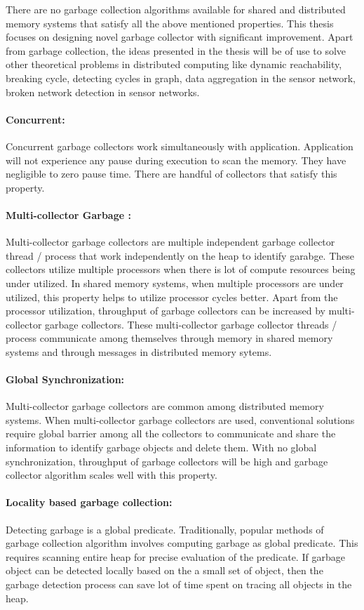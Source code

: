 There are no garbage collection algorithms available for shared and distributed memory systems that satisfy all the above mentioned properties.  This thesis focuses on designing novel garbage collector with significant improvement. Apart from garbage collection, the ideas presented in the thesis will be of use to solve other theoretical problems in distributed computing like dynamic reachability, breaking cycle, detecting cycles in graph, data aggregation in the sensor network, broken network detection in sensor networks.


\paragraph{Concurrent:}
	Concurrent garbage collectors work simultaneously with application. Application will not experience any pause during execution to scan the memory. They
	have negligible to zero pause time. There are handful of collectors that satisfy this property. 
\paragraph{Multi-collector Garbage :}
	Multi-collector garbage collectors are multiple independent garbage collector thread / process that work independently on the heap to identify garabge. These collectors utilize multiple processors when there is lot of compute resources being under utilized. In shared memory systems, when multiple processors are under utilized, this property helps to utilize processor cycles better. Apart from the processor utilization, throughput of garbage collectors can be increased by multi-collector garbage collectors. These multi-collector garbage collector threads / process communicate among themselves through memory in shared memory systems and through messages in distributed memory sytems.
\paragraph{Global Synchronization:}
	Multi-collector garbage collectors are common among distributed memory systems. 
	When multi-collector garbage collectors are used, conventional solutions require global barrier among all the collectors to communicate and share the information to identify garbage objects and delete them. With no global synchronization, throughput of garbage collectors will be high and garbage collector algorithm scales well with this property.
\paragraph{Locality based garbage collection:}
	Detecting garbage is a global predicate. Traditionally, popular methods of garbage collection algorithm involves computing garbage as global predicate. This requires scanning entire heap for precise evaluation of the predicate. If garbage object can be detected locally based on the a small set of object, then the garbage detection process can save lot of time spent on tracing all objects in the heap.
